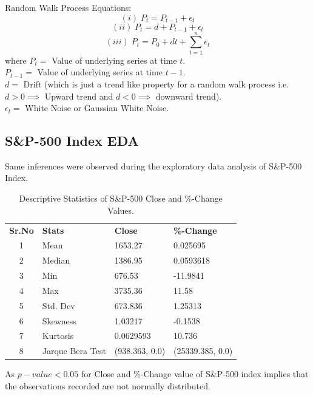 \documentclass[conference]{IEEEtran}
\begin{document}
Random Walk Process Equations:  $$(i)\; P_{t} = P_{t - 1} + \epsilon_{t}$$
$$ (ii)\; P_{t} = d + P_{t - 1} + \epsilon_{t}$$
$$ (iii)\; P_{t} = P_{0} + dt + \sum_{t = 1}^{n} \epsilon_{t} $$
where   $P_{t} = $ Value of underlying series at time $t$. \\
$P_{t - 1} = $  Value of underlying series at time $t - 1$. \\
$d = $ Drift (which is just a trend like property for a random walk process i.e.\\ $d > 0 \implies$ Upward trend and $d < 0 \implies$ downward trend).\\
$\epsilon_{t} = $ White Noise or Gaussian White Noise.

\subsection{S\&P-500 Index EDA}
Same inferences were observed during the exploratory data analysis of S\&P-500 Index.
\begin{table}[htbp]
	\caption{Descriptive Statistics of S\&P-500 Close and \%-Change Values.}
	\begin{tabular}{c l l l}
		\textbf{Sr.No} & \textbf{Stats}   & \textbf{Close} & \textbf{\%-Change} \\
		1              & Mean             & 1653.27        & 0.025695           \\
		2              & Median           & 1386.95        & 0.0593618          \\
		3              & Min              & 676.53         & -11.9841           \\
		4              & Max              & 3735.36        & 11.58              \\
		5              & Std. Dev         & 673.836        & 1.25313            \\
		6              & Skewness         & 1.03217        & -0.1538            \\
		7              & Kurtosis         & 0.0629593      & 10.736             \\
		8              & Jarque Bera Test & (938.363, 0.0) & (25339.385, 0.0)   \\
	\end{tabular}
\end{table}
	
As $p-value < 0.05$ for Close and \%-Change value of S\&P-500 index implies that the observations recorded are not normally distributed.
	
\end{document}
